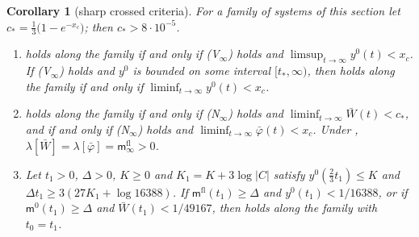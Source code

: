 \documentclass[11pt,a4paper]{amsart}
\newtheorem{corollary}[theorem]{Corollary}
\theoremstyle{definition}
\theoremstyle{remark}
\numberwithin{equation}{section}
\newcommand{\abs}[1]{\lvert #1\rvert}      %
\newcommand{\Mcirc}{\text{\upshape(M$^{\circ}$)}}   %
\newcommand{\tzero}{t_0}                   %
\begin{document}
\begin{corollary}[sharp crossed criteria]\label{cor:sharp-crossed}
For a family of systems of this section let $c_*=\frac13\bigl(1-e^{-x_c}\bigr)$; then $c_*>8\cdot10^{-5}$.
\begin{enumerate}[label=\textup{(\roman*)},leftmargin=*]
\item \Mcirc{} holds along the family if and only if \textup{(V$_\infty$)} holds and $\limsup_{t\to\infty}y^0(t)<x_c$. If \textup{(V$_\infty$)} holds and $y^0$ is bounded on some interval $[t_*,\infty)$, then \Mcirc{} holds along the family if and only if $\liminf_{t\to\infty}y^0(t)<x_c$.
\item \Mcirc{} holds along the family if and only if \textup{(N$_\infty$)} holds and $\liminf_{t\to\infty}\bar W(t)<c_*$, and if and only if \textup{(N$_\infty$)} holds and $\liminf_{t\to\infty}\bar\varphi(t)<x_c$. Under \Mcirc{}, $\lambda[\bar W]=\lambda[\bar\varphi]=\mathsf m^{\mathrm{fl}}_\infty>0$.
\item Let $t_1>0$, $\Delta>0$, $K\ge0$ and $K_1=K+3\log\abs{C}$ satisfy $y^0(\frac23t_1)\le K$ and $\Delta t_1\ge3(27K_1+\log16388)$. If $\mathsf m^{\mathrm{fl}}(t_1)\ge\Delta$ and $y^0(t_1)<1/16388$, or if $\mathsf m^0(t_1)\ge\Delta$ and $\bar W(t_1)<1/49167$, then \Mcirc{} holds along the family with $\tzero=t_1$.
\end{enumerate}
\end{corollary}
\end{document}
